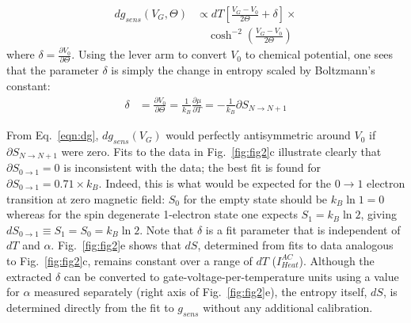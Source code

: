 \documentclass[preprint,showpacs,preprintnumbers,amsmath,amssymb,pra,aps,superscriptaddress]{revtex4-1}
\begin{document}

%
\begin{align}
\label{eqn:dg}
        dg_{sens}(V_G, \Theta) &\propto dT \left[ \frac{V_G-V_0}{2\Theta} +\delta \right]\times \\
        				      &\quad\cosh^{-2}\left(\frac{V_G-V_0}{2\Theta}\right) \nonumber
\end{align}
%
where $\delta=\frac{\partial V_0}{\partial \Theta}$. Using the lever arm to convert $V_0$ to chemical potential, one sees that the parameter $\delta$ is simply the change in entropy scaled by Boltzmann's constant:
%
\begin{align}
\label{eqn:delta}
        \delta &= \frac{\partial V_0}{\partial \Theta} = 
        \frac{1}{k_B} \frac{\partial \mu}{\partial T} = 
        -\frac{1}{k_B} \partial S_{N\rightarrow N+1}
\end{align}
%

From Eq.~\ref{eqn:dg}, $dg_{sens}(V_G)$ would perfectly antisymmetric around $V_0$ if $\partial S_{N\rightarrow N+1}$ were zero.  Fits to the data in Fig.~\ref{fig:fig2}c illustrate clearly that $\partial S_{0\rightarrow 1}=0$ is inconsistent with the data;  the best fit is found for $\partial S_{0\rightarrow 1}=0.71\times k_B$.  Indeed, this is what would be expected for the $0 \rightarrow 1$ electron transition at zero magnetic field: $S_0$ for the empty state should be $k_B \ln{1}=0$ whereas for the spin degenerate 1-electron state one expects $S_1=k_B\ln{2}$, giving $dS_{0\rightarrow 1}\equiv S_1 = S_0 =k_B\ln{2}$.%
Note that $\delta$ is a fit parameter that is independent of $dT$ and $\alpha$. Fig.~\ref{fig:fig2}e shows that $dS$,  determined from fits to data analogous to Fig.~\ref{fig:fig2}c, remains constant over a range of $dT$ ($I^{AC}_{Heat}$).  Although the extracted $\delta$ can be converted to gate-voltage-per-temperature units using a value for $\alpha$ measured separately (right axis of Fig.~\ref{fig:fig2}e), the entropy itself, $dS$, is determined directly from the fit to $g_{sens}$ without any additional calibration.
\end{document}
